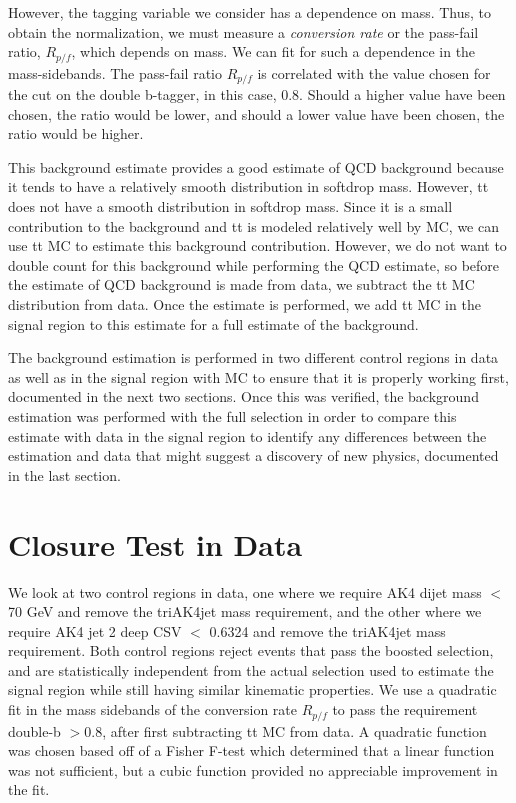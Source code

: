 However, the tagging variable we consider has a dependence on mass.
Thus, to obtain the normalization, we must measure a \textit{conversion rate} or the pass-fail ratio, $R_{p/f}$, which depends on mass. We can fit for such a dependence in the mass-sidebands. The pass-fail ratio $R_{p/f}$ is correlated with the value chosen for the cut on the double b-tagger, in this case, 0.8. Should a higher value have been chosen, the ratio would be lower, and should a lower value have been chosen, the ratio would be higher.

This background estimate provides a good estimate of QCD background because it tends to have a relatively smooth distribution in softdrop mass. However, tt does not have a smooth distribution in softdrop mass. Since it is a small contribution to the background and tt is modeled relatively well by MC, we can use tt MC to estimate this background contribution. However, we do not want to double count for this background while performing the QCD estimate, so before the estimate of QCD background is made from data, we subtract the tt MC distribution from data. Once the estimate is performed, we add tt MC in the signal region to this estimate for a full estimate of the background.

The background estimation is performed in two different control regions in data as well as in the signal region with MC to ensure that it is properly working first, documented in the next two sections. Once this was verified, the background estimation was performed with the full selection in order to compare this estimate with data in the signal region to identify any differences between the estimation and data that might suggest a discovery of new physics, documented in the last section.

\section{Closure Test in Data\label{ss:BkgValInData}}

We look at two control regions in data, one where we require AK4 dijet mass $<$ 70 GeV and remove the triAK4jet mass requirement, and the other where we require AK4 jet 2 deep CSV $<$ 0.6324 and remove the triAK4jet mass requirement. Both control regions reject events that pass the boosted selection, and are statistically independent from the actual selection used to estimate the signal region while still having similar kinematic properties. We use a quadratic fit in the mass sidebands of the conversion rate $R_{p/f}$ to pass the requirement double-b $ > 0.8$, after first subtracting tt MC from data. A quadratic function was chosen based off of a Fisher F-test which determined that a linear function was not sufficient, but a cubic function provided no appreciable improvement in the fit. 

